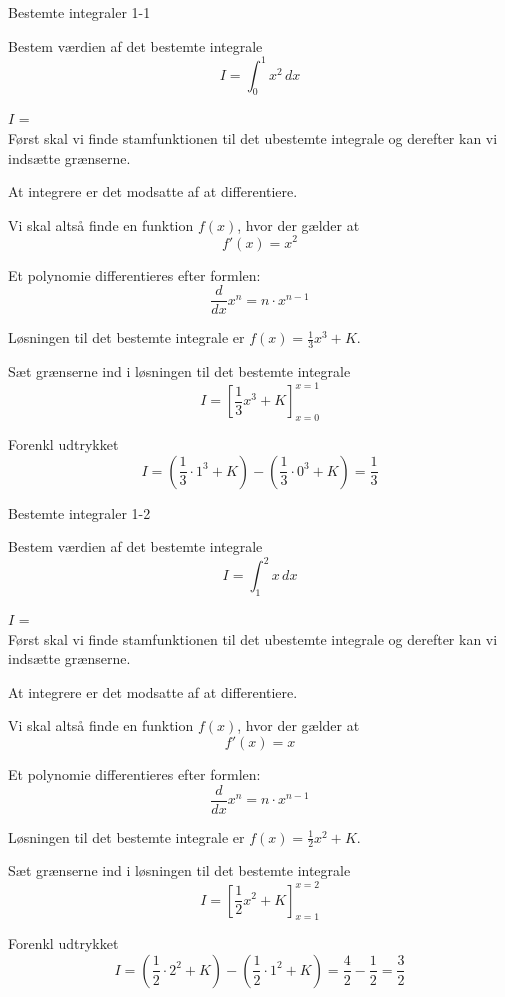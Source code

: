 \documentclass{article}
\begin{document}
\tableofcontents

\begin{exercise}{Bestemte integraler 1-1}

Bestem værdien af det bestemte integrale
\[
I = \int_0^1 x^2 \, dx
\]

$I$ =  \\


\hint
Først skal vi finde stamfunktionen til det ubestemte integrale og derefter kan vi indsætte grænserne.

\hint
At integrere er det modsatte af at differentiere.

\hint
Vi skal altså finde en funktion $f(x)$, hvor der gælder at
\[
f'(x) = x^2
\]

\hint
Et polynomie differentieres efter formlen:
\[
\frac{d}{dx} x^n = n \cdot x^{n - 1}
\]

\hint
Løsningen til det bestemte integrale er $f(x) = \frac{1}{3} x^3 + K$.

\hint
Sæt grænserne ind i løsningen til det bestemte integrale
\[
I = \left[ \frac{1}{3} x^3 + K \right]_{x=0}^{x=1}
\]

\hint
Forenkl udtrykket
\[
I = \left( \frac{1}{3} \cdot 1^3 + K \right) - \left( \frac{1}{3} \cdot 0^3 + K \right) = \frac{1}{3}
\]


\end{exercise}

\newpage

\begin{exercise}{Bestemte integraler 1-2}
	
	Bestem værdien af det bestemte integrale
	\[
	I = \int_1^2 x \, dx
	\]
	
	$I$ =  \\
	
	
	\hint
	Først skal vi finde stamfunktionen til det ubestemte integrale og derefter kan vi indsætte grænserne.
	
	\hint
	At integrere er det modsatte af at differentiere.
	
	\hint
	Vi skal altså finde en funktion $f(x)$, hvor der gælder at
	\[
	f'(x) = x
	\]
	
	\hint
	Et polynomie differentieres efter formlen:
	\[
	\frac{d}{dx} x^n = n \cdot x^{n - 1}
	\]
	
	\hint
	Løsningen til det bestemte integrale er $f(x) = \frac{1}{2} x^2 + K$.
	
	\hint
	Sæt grænserne ind i løsningen til det bestemte integrale
	\[
	I = \left[ \frac{1}{2} x^2 + K \right]_{x=1}^{x=2}
	\]
	
	\hint
	Forenkl udtrykket
	\[
	I = \left( \frac{1}{2} \cdot 2^2 + K \right) - \left( \frac{1}{2} \cdot 1^2 + K \right) = \frac{4}{2} - \frac{1}{2}=  \frac{3}{2}
	\]

	
\end{exercise}
\end{document}
